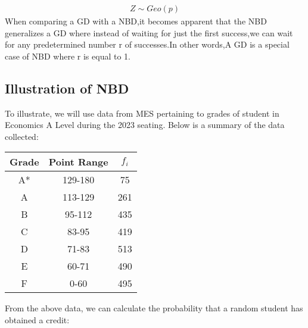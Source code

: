 \documentclass{article}
\begin{document}
\begin{gather*}
  Z \sim Geo(p)
\end{gather*}
When comparing a GD with a NBD,it becomes apparent that the NBD generalizes 
a GD where instead of waiting for just the first success,we can wait for 
any predetermined number r of successes.In other words,A GD is a special
case of NBD where r is equal to 1.

\subsection{Illustration of NBD}
To illustrate, we will use data from MES pertaining
to grades of student in Economics A Level during the 2023 seating.
Below is a summary of the data collected:

\begin{center}
  \begin{tabular}{|c|c|c|}
    \hline
    \textbf{Grade} & \textbf{Point Range} & \textbf{$f_i$} \\ %
    \hline
    \hline
    A* & 129-180	& 75	\\ %
    A  & 113-129	& 261	\\ %
    B  & 95-112	  & 435	\\ %
    C  & 83-95	  & 419	\\ %
    D  & 71-83	  & 513	\\ %
    E  & 60-71	  & 490	\\ %
    F  & 0-60	    & 495	\\ %
    \hline
  \end{tabular}
\end{center}

From the above data, we can calculate the probability that
a random student has obtained a credit:
\end{document}
